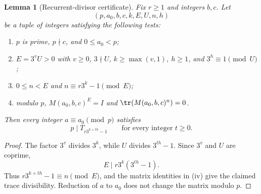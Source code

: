\documentclass[11pt,a4paper]{article}
\newtheorem{lemma}[theorem]{Lemma}\newtheorem{proposition}[theorem]{Proposition}
\theoremstyle{definition}\newtheorem{definition}[theorem]{Definition}
\theoremstyle{remark}\newtheorem{remark}[theorem]{Remark}
\begin{document}
\begin{lemma}[Recurrent-divisor certificate]\label{R04:lem:cert}
Fix $r\ge1$ and integers $b,c$. Let
\[
 (p,a_0,b,c,k,E,U,n,h)
\]
be a tuple of integers satisfying the following tests:
\begin{enumerate}[label=\textup{(\roman*)}]
\item $p$ is prime, $p\nmid c$, and $0\le a_0<p$;
\item $E=3^vU>0$ with $v\ge0$, $3\nmid U$, $k\ge\max(v,1)$,
$h\ge1$, and $3^h\equiv1\pmod U$;
\item $0\le n<E$ and $n\equiv r3^k-1\pmod E$;
\item modulo $p$, $M(a_0,b,c)^E=I$ and
$\tr(M(a_0,b,c)^n)=0$.
\end{enumerate}
Then every integer $a\equiv a_0\pmod p$ satisfies
\[
 p\mid T_{r3^{k+th}-1}\qquad\text{for every integer }t\ge0.
\]
\end{lemma}
\begin{proof}
The factor $3^v$ divides $3^k$, while $U$ divides $3^{th}-1$.
Since $3^v$ and $U$ are coprime,
\[
 E\mid r3^k(3^{th}-1).
\]
Thus $r3^{k+th}-1\equiv n\pmod E$, and the matrix identities in
(iv) give the claimed trace divisibility. Reduction of $a$ to $a_0$
does not change the matrix modulo $p$.
\end{proof}
\end{document}

